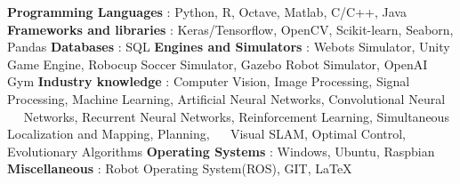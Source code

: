\begin{cventries}  
\skillentry
    {
    \bullet \space \textbf{Programming Languages} : Python, R, Octave, Matlab, C/C++, Java \newline
    \bullet \space \textbf{Frameworks and libraries} : Keras/Tensorflow, OpenCV, Scikit-learn, Seaborn, Pandas   \newline
    \bullet \space \textbf{Databases} : SQL
    \bullet \space \textbf{Engines and Simulators} : Webots Simulator, Unity Game Engine, Robocup Soccer Simulator, Gazebo Robot Simulator, OpenAI Gym \newline
    \bullet \space \textbf{Industry knowledge} : Computer Vision, Image Processing, Signal Processing, Machine Learning, Artificial Neural Networks, Convolutional Neural \newline $\quad$ Networks, Recurrent Neural Networks, Reinforcement Learning, Simultaneous Localization and Mapping, Planning, \newline $\quad$ Visual SLAM, Optimal Control, Evolutionary Algorithms   \newline
    \bullet \space \textbf{Operating Systems} : Windows, Ubuntu, Raspbian \newline
    \bullet \space \textbf{Miscellaneous} : Robot Operating System(ROS), GIT, LaTeX
    }
\end{cventries}
